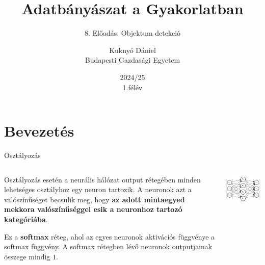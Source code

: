 \documentclass[english, aspectratio=169]{beamer}
\makeatletter
\newcommand\makebeamertitle{\frame{\maketitle}}
\let\origtableofcontents=\tableofcontents
\def\tableofcontents{\@ifnextchar[{\origtableofcontents}{\gobbletableofcontents}}
\def\gobbletableofcontents#1{\origtableofcontents}
\makeatother
\begin{document}
\section{Bevezetés}
\title[]{Adatbányászat a Gyakorlatban}
\subtitle{8. Előadás: Objektum detekció}
\author[Kuknyó Dániel]{Kuknyó Dániel\\Budapesti Gazdasági Egyetem}
\date{2024/25\\1.félév}
\makebeamertitle

\begin{frame}
\tableofcontents{}
\end{frame}

\begin{frame}
\tableofcontents[currentsection]
\end{frame}

\begin{frame}{Osztályozás}
\begin{columns}
\begin{column}{.5\textwidth}
Osztályozás esetén a neurális hálózat output rétegében minden lehetséges osztályhoz egy neuron tartozik. A neuronok azt a valószínűséget becsülik meg, hogy \textbf{az adott mintaegyed mekkora valószínűséggel esik a neuronhoz tartozó kategóriába}.\par\smallskip
Ez a \textbf{softmax} réteg, ahol az egyes neuronok aktivációs függvénye a softmax függvény. A softmax rétegben lévő neuronok outputjainak összege mindig $1$.
\end{column}
\begin{column}{.5\textwidth}
\begin{center}
\includegraphics[width=7cm, keepaspectratio]{../../7_dl/doc/graphs/dl_1.png}
\end{center}
\end{column}
\end{columns}
\end{frame}
\end{document}
